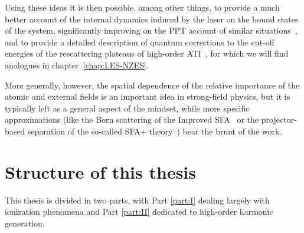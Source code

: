 Using these ideas it is then possible, among other things, to provide a much better account of the internal dynamics induced by the laser on the bound states of the system, significantly improving on the PPT account of similar situations~\cite{frolov_effective-range-theory_2008}, and to provide a detailed description of quantum corrections to the cut-off energies of the rescattering plateaus of high-order ATI~\cite{HATI_quantum_correction_2}, for which we will find analogues in chapter~\ref{chap:LES-NZES}.

More generally, however, the spatial dependence of the relative importance of the atomic and external fields is an important idea in strong-field physics, but it is typically left as a general aspect of the mindset, while more specific approximations (like the Born scattering of the Improved SFA~\cite{milosevic_ISFA-standard_2007} or the projector-based separation of the so-called SFA+ theory~\cite{perez-hernandez_sfa-plus_2009}) bear the brunt of the work.












\section{Structure of this thesis}
This thesis is divided in two parts, with Part \ref{part:I} dealing largely with ionization phenomena and Part \ref{part:II} dedicated to high-order harmonic generation. 


